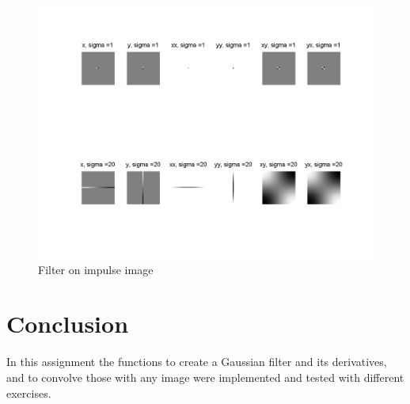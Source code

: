 \documentclass[11pt]{article}
\begin{document}
\begin{figure}[h!]
\includegraphics[scale=0.6]{impulse.png}
\caption{Filter on impulse image}
\label{impulse}
\end{figure}

\section{Conclusion}
In this assignment the functions to create a Gaussian filter and its derivatives, and to convolve those with any image were implemented and tested with different exercises. 
\end{document}

